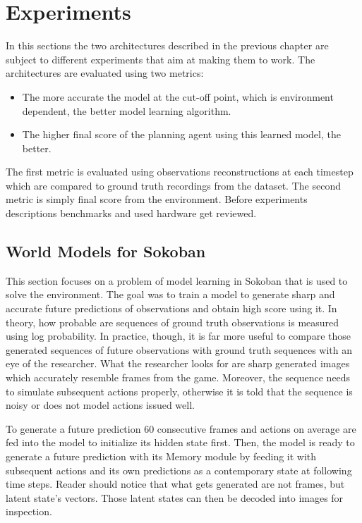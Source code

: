\section{Experiments}

In this sections the two architectures described in the previous chapter are subject to different experiments that aim at making them to work. The architectures are evaluated using two metrics:
\begin{itemize}
\item The more accurate the model at the cut-off point, which is environment dependent, the better model learning algorithm.
\item The higher final score of the planning agent using this learned model, the better.
\end{itemize}
The first metric is evaluated using observations reconstructions at each timestep which are compared to ground truth recordings from the dataset. The second metric is simply final score from the environment.
Before experiments descriptions benchmarks and used hardware get reviewed.

\subsection{World Models for Sokoban}

This section focuses on a problem of model learning in Sokoban that is used to solve the environment. The goal was to train a model to generate sharp and accurate future predictions of observations and obtain high score using it. In theory, how probable are sequences of ground truth observations is measured using log probability. In practice, though, it is far more useful to compare those generated sequences of future observations with ground truth sequences with an eye of the researcher. What the researcher looks for are sharp generated images which accurately resemble frames from the game. Moreover, the sequence needs to simulate subsequent actions properly, otherwise it is told that the sequence is noisy or does not model actions issued well.

To generate a future prediction 60 consecutive frames and actions on average are fed into the model to initialize its hidden state first. Then, the model is ready to generate a future prediction with its Memory module by feeding it with subsequent actions and its own predictions as a contemporary state at following time steps. Reader should notice that what gets generated are not frames, but latent state's vectors. Those latent states can then be decoded into images for inspection.

